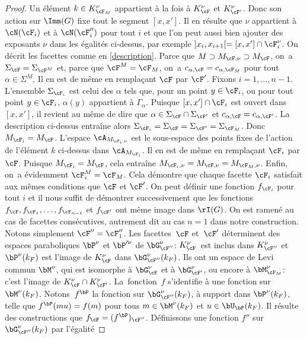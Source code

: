 \begin{proof}
Un élément $k\in K_{\cF_{M}}^{\nu}$ appartient à la fois à $K_{\cF}^{\nu}$ et $K_{\cF'}^{\nu}$. Donc son action sur $\Imm(G)$ fixe tout le segment $[x,x']$. Il en résulte que $\nu$ appartient à $\cN(\cF_{i})$ et à $\cN(\cF''_{i})$ pour tout $i$ et que l'on peut aussi bien ajouter des exposants $\nu$ dans les égalités ci-dessus, par exemple $]x_{i},x_{i+1}[=[x,x']\cap \cF_{i}^{\nu}$. On décrit les facettes comme en \ref{description}. Parce que $M\supset M_{\cF,\nu}\supset M_{\cF}$, on~a $\Sigma_{\cF}=\Sigma_{\cF^{M}}$ et, parce que $\cF^M=\cF_{M}$, on~a $c_{\alpha,\cF}=c_{\alpha,\cF_{M}}$ pour tout $\alpha\in \Sigma^M$. Il en est de même en remplaçant $\cF$ par $\cF'$. Fixons $i=1,\dots,n-1$. L'ensemble $\Sigma_{\cF_{i}}$ est celui des $\alpha$ tels que, pour un point $y\in \cF_{i}$, ou pour tout point $y\in \cF_{i}$, $\alpha(y)$ appartient à $\Gamma_{\alpha}$. Puisque $[x,x']\cap \cF_{i}$ est ouvert dans $[x,x']$, il revient au même de dire que $\alpha\in \Sigma_{\cF}\cap \Sigma_{\cF'}$ et $c_{\alpha,\cF}=c_{\alpha,\cF'}$. La description ci-dessus entraîne alors $\Sigma_{\cF_{i}}=\Sigma_{\cF}=\Sigma_{\cF'}=\Sigma_{\cF_{M}}$. Donc $M_{\cF_{i}}=M_{\cF}$. L'espace $\cA_{M_{\cF_{i},\nu}}$ est le sous-espace des points fixes de l'action de l'élément $k$ ci-dessus dans $\cA_{M_{\cF_{i}}}$. Il en est de même en remplaçant $\cF_{i}$ par $\cF$. Puisque $M_{\cF_{i}}=M_{\cF}$, cela entraîne $M_{\cF_{i},\nu}=M_{\cF,\nu}=M_{\cF_{M},\nu}$. Enfin, on~a évidemment $\cF_{i}^M=\cF_{M}$. Cela démontre que chaque facette $\cF_{i}$ satisfait aux mêmes conditions que $\cF$ et $\cF'$. On peut définir une fonction $f_{\cF_{i}}$ pour tout $i$ et il nous suffit de démontrer successivement que les fonctions $f_{\cF}, f_{\cF_{1}},\dots,f_{\cF_{n-1}}$ et $f_{\cF'}$ ont même image dans $\rI(G)$. On est ramené au cas de facettes consécutives, autrement dit au cas $n=1$ dans notre construction. Notons simplement $\cF''=\cF''_{1}$. Les facettes~$\cF$ et~$\cF'$ déterminent des espaces paraboliques $\bP^{\nu}$ et $\bP^{\prime\nu}$ de $\bG_{\cF''}^{\nu}$: $K_{\cF}^{\nu}$~est inclus dans $ K_{\cF''}^{\nu}$ et $\bP^{\nu}(k_{F})$ est l'image de $K_{\cF}^{\nu}$ dans $\bG_{\cF''}^{\nu}(k_{F})$. Ils ont un espace de Levi commun $\bM^{\nu}$, qui est isomorphe à $\bG_{\cF}^{\nu}$ et à $\bG_{\cF'}^{\nu}$, ou encore à $\bM_{\cF_{M}}^{\nu}$: c'est l'image de $K_{\cF}^{\nu}\cap K_{\cF'}^{\nu}$. La~fonction~$f$ s'identifie à une fonction sur $\bM^{\nu}(k_{F})$. Notons~$f^{\bP}$ la fonction sur $\bG_{\cF''}^{\nu}(k_{F})$, à support dans $\bP^{\nu}(k_{F})$, telle que $f^{\bP}(mu)=f(m)$ pour tous $m\in \bM^{\nu}(k_{F})$ et $u\in \bU_{\bP}(k_{F})$. Il résulte des constructions que $f_{\cF}=(f^{\bP})_{\cF''}$. Définissons une fonction $f''$ sur $\bG^{\nu}_{\cF''}(k_{F})$ par l'égalité

\end{proof}
